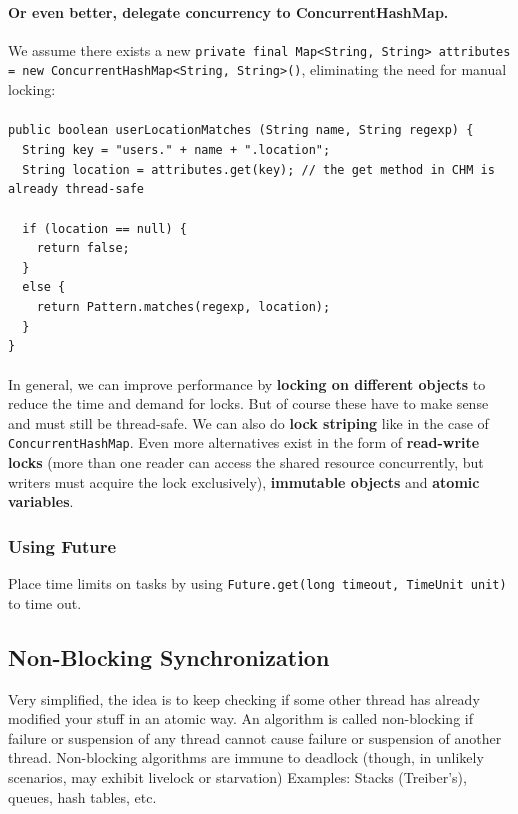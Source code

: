 \documentclass{article}
\begin{document}
\paragraph{Or even better, delegate concurrency to ConcurrentHashMap.} We assume there exists a new \lstinline{private final Map<String, String> attributes = new ConcurrentHashMap<String, String>()}, eliminating the need for manual locking:\\\\
\lstinline|public boolean userLocationMatches (String name, String regexp) {|\\
\lstinline|  String key = "users." + name + ".location";|\\
\lstinline|  String location = attributes.get(key); // the get method in CHM is already thread-safe|\\\\
\lstinline|  if (location == null) {|\\
\lstinline|    return false;|\\
\lstinline|  }|\\
\lstinline|  else {|\\
\lstinline|    return Pattern.matches(regexp, location);|\\
\lstinline|  }|\\
\lstinline|}|\\\\
In general, we can improve performance by \textbf{locking on different objects} to reduce the time and demand for locks. But of course these have to make sense and must still be thread-safe. We can also do \textbf{lock striping} like in the case of \lstinline{ConcurrentHashMap}. Even more alternatives exist in the form of \textbf{read-write locks} (more than one reader can access the shared resource concurrently, but writers must acquire the lock exclusively), \textbf{immutable objects} and \textbf{atomic variables}.

\subsubsection{Using Future}
Place time limits on tasks by using \lstinline{Future.get(long timeout, TimeUnit unit)} to time out.\\


\subsection{Non-Blocking Synchronization}
Very simplified, the idea is to keep checking if some other thread has already modified your stuff in an atomic way. An algorithm is called non-blocking if failure or suspension of any thread cannot cause failure or suspension of another thread. Non-blocking algorithms are immune to deadlock (though, in unlikely scenarios, may exhibit livelock or starvation) Examples: Stacks (Treiber's), queues, hash tables, etc.
\end{document}
